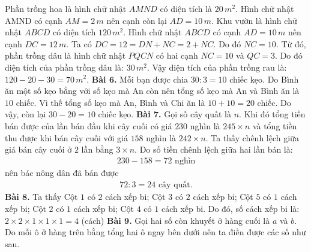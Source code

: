 \begin{multicols}{2}
\begin{figure}[H]
		\vspace*{-10pt}
	\end{figure}
	Phần trồng hoa là hình chữ nhật $AMND$ có diện tích là $20\,m^2$. Hình chữ nhật AMND có cạnh $AM=2\,m$ nên cạnh còn lại $AD=10\,m$.
	\vskip 0.1cm
	Khu vườn là hình chữ nhật $ABCD$ có diện tích $120\, m^2$. Hình chữ nhật $ABCD$ có cạnh $AD=10\,m$ nên cạnh $DC = 12\,m$.
	\vskip 0.1cm
	Ta có
	$DC = 12 = DN + NC = 2 + NC$. Do đó $NC=10$.
	\vskip 0.1cm
	Từ đó, phần trồng dâu là hình chữ nhật $PQCN$ có hai cạnh $NC=10$ và $QC=3$. Do đó diện tích của phần trồng dâu là: $30\,m^2$.
	\vskip 0.1cm
	Vậy diện tích của phần trồng rau là: $120 - 20 - 30 = 70\,m^2$. 
	\vskip 0.1cm
	\textbf{\color{toancuabi}Bài $\pmb6$.}
	Mỗi bạn được chia $30: 3=10$ chiếc kẹo.
	\vskip 0.1cm
	Do Bình ăn một số kẹo bằng với số kẹo mà An còn nên tổng số kẹo mà An và Bình ăn là $10$ chiếc. Vì thế tổng số kẹo mà An, Bình và Chi ăn là $10+10=20$ chiếc. Do vậy, còn lại $30-20=10$ chiếc kẹo.
	\vskip 0.1cm
	\textbf{\color{toancuabi}Bài $\pmb7$.} Gọi số cây quất là $n$. Khi đó tổng tiền bán được của lần bán đầu khi cây cuối có giá $230$ nghìn là $245\times n$ và tổng tiền thu được khi bán cây cuối với giá $158$ nghìn là $242\times n$. Ta thấy chênh lệch giữa giá bán cây cuối ở $2$ lần bằng $3\times n$. Do số tiền chênh lệch giữa hai lần bán là: 
	\begin{align*}
		230-158=72 \text{ nghìn}
	\end{align*}
	nên bác nông dân đã bán được 
	\begin{align*}
		72:3 = 24 \text{ cây quất.}
	\end{align*}
	\textbf{\color{toancuabi}Bài $\pmb8$.} Ta thấy
	Cột $1$ có $2$ cách xếp bi;
	\vskip 0.1cm
	Cột $3$ có $2$ cách xếp bi;
	\vskip 0.1cm
	Cột $5$ có $1$ cách xếp  bi;
	\vskip 0.1cm
	Cột $2$ có $1$ cách xếp  bi;
	\vskip 0.1cm
	Cột $4$ có $1$ cách xếp  bi.
	\vskip 0.1cm
	Do đó, số cách xếp bi là: $2\times 2\times 1\times 1\times 1 = 4$ (cách)
	\vskip 0.1cm
	\textbf{\color{toancuabi}Bài $\pmb9$.} Gọi hai số còn khuyết ở hàng cuối là $a$ và $b$. Do mỗi ô ở hàng trên bằng tổng hai ô ngay bên dưới nên ta điền được các số như sau.
	\begin{figure}[H]
		\vspace*{-5pt}
		\centering
		\captionsetup{labelformat= empty, justification=centering}

\end{figure}
\end{multicols}
